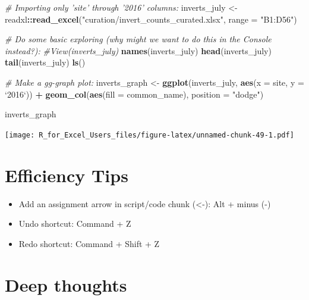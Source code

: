 \documentclass[]{book}
\newenvironment{Shaded}{\begin{snugshade}}{\end{snugshade}}
\newcommand{\CommentTok}[1]{\textcolor[rgb]{0.56,0.35,0.01}{\textit{#1}}}
\newcommand{\DataTypeTok}[1]{\textcolor[rgb]{0.13,0.29,0.53}{#1}}
\newcommand{\KeywordTok}[1]{\textcolor[rgb]{0.13,0.29,0.53}{\textbf{#1}}}
\newcommand{\NormalTok}[1]{#1}
\newcommand{\OperatorTok}[1]{\textcolor[rgb]{0.81,0.36,0.00}{\textbf{#1}}}
\newcommand{\StringTok}[1]{\textcolor[rgb]{0.31,0.60,0.02}{#1}}
\providecommand{\tightlist}{%
  \setlength{\itemsep}{0pt}\setlength{\parskip}{0pt}}
\begin{document}
\begin{Shaded}
\begin{Highlighting}[]
\CommentTok{# Importing only 'site' through '2016' columns: }
\NormalTok{inverts_july <-}\StringTok{ }\NormalTok{readxl}\OperatorTok{::}\KeywordTok{read_excel}\NormalTok{(}\StringTok{"curation/invert_counts_curated.xlsx"}\NormalTok{, }\DataTypeTok{range =} \StringTok{"B1:D56"}\NormalTok{)}

\CommentTok{# Do some basic exploring (why might we want to do this in the Console instead?):}
\CommentTok{#View(inverts_july)}
\KeywordTok{names}\NormalTok{(inverts_july)}
\KeywordTok{head}\NormalTok{(inverts_july)}
\KeywordTok{tail}\NormalTok{(inverts_july)}
\KeywordTok{ls}\NormalTok{()}

\CommentTok{# Make a gg-graph plot: }
\NormalTok{inverts_graph <-}\StringTok{ }\KeywordTok{ggplot}\NormalTok{(inverts_july, }\KeywordTok{aes}\NormalTok{(}\DataTypeTok{x =}\NormalTok{ site, }\DataTypeTok{y =} \StringTok{`}\DataTypeTok{2016}\StringTok{`}\NormalTok{)) }\OperatorTok{+}
\StringTok{  }\KeywordTok{geom_col}\NormalTok{(}\KeywordTok{aes}\NormalTok{(}\DataTypeTok{fill =}\NormalTok{ common_name), }
           \DataTypeTok{position =} \StringTok{"dodge"}\NormalTok{)}
\end{Highlighting}
\end{Shaded}

\begin{Shaded}
\begin{Highlighting}[]
\NormalTok{inverts_graph}
\end{Highlighting}
\end{Shaded}

\texttt{[image: R\_for\_Excel\_Users\_files/figure-latex/unnamed-chunk-49-1.pdf]}

\hypertarget{efficiency-tips-3}{%
\section{Efficiency Tips}\label{efficiency-tips-3}}

\begin{itemize}
\tightlist
\item
  Add an assignment arrow in script/code chunk (\textless{}-): Alt + minus (-)
\item
  Undo shortcut: Command + Z
\item
  Redo shortcut: Command + Shift + Z
\end{itemize}

\hypertarget{deep-thoughts}{%
\section{Deep thoughts}\label{deep-thoughts}}
\end{document}
